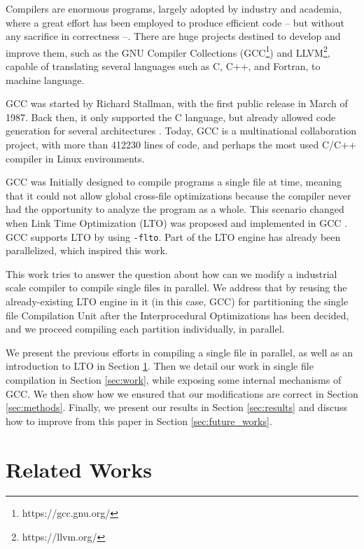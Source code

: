 \documentclass[runningheads]{llncs}
\begin{document}
Compilers are enormous programs, largely adopted by industry and academia, where
a great effort has been employed to produce efficient code --
but without any sacrifice in correctness --. There are huge projects destined
to develop and improve them, such as the GNU Compiler Collections
(GCC\footnote{https://gcc.gnu.org/}) and LLVM\footnote{https://llvm.org/}, capable
of translating several languages such as C, C++, and Fortran, to machine language.

GCC was started by Richard Stallman, with the first public release in March of
1987. Back then, it
only supported the C language, but already allowed code generation for several
architectures \cite{gcc-first-ver}. Today, GCC is a multinational collaboration
project, with more than 412230 lines of code, and perhaps the most used C/C++
compiler in Linux environments.

GCC was Initially designed to compile programs a single file at time, meaning
that it could not allow global cross-file optimizations because the compiler
never had the opportunity to analyze the program as a whole. This scenario
changed when Link Time Optimization (LTO) was proposed \cite{whoprgoogle} and
implemented in GCC \cite{glek2010optimizing}. GCC supports LTO by using
\texttt{-flto}. Part of the LTO engine has already been parallelized, which
inspired this work.

This work tries to answer the question about how can we modify a
industrial scale compiler to compile single files in parallel. We address
that by reusing the already-existing LTO engine in it (in this
case, GCC) for partitioning the single file Compilation Unit after the
Interprocedural Optimizations has been decided, and we proceed compiling
each partition individually, in parallel.

We present the previous efforts in compiling a single file in
parallel, as well as an introduction to LTO in Section \ref{sec:related}.
Then we detail our work in single file compilation in
Section \ref{sec:work}, while exposing some internal mechanisms
of GCC. We then show how we ensured that our modifications are correct
in Section \ref{sec:methods}. Finally, we present our results in
Section \ref{sec:results} and discuss how to improve from this paper
in Section \ref{sec:future_works}.

\section{Related Works} \label{sec:related}
\end{document}
